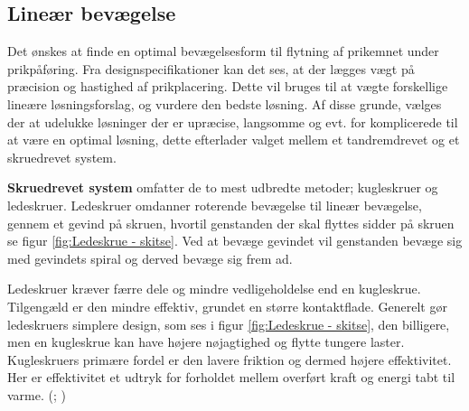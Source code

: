 \subsection{Lineær bevægelse} \label{løsningsanal: Lineær bevægelse}
Det ønskes at finde en optimal bevægelsesform til flytning af prikemnet under prikpåføring. Fra designspecifikationer kan det ses, at der lægges vægt på præcision og hastighed af prikplacering. Dette vil bruges til at vægte forskellige lineære løsningsforslag, og vurdere den bedste løsning.
Af disse grunde, vælges der at udelukke løsninger der er upræcise, langsomme og evt. for komplicerede til at være en optimal løsning, dette efterlader valget mellem et tandremdrevet og et skruedrevet system. \parencite{IndustrialQuickSearch2025LinearPrinciples}

\textbf{Skruedrevet system} omfatter de to mest udbredte metoder; kugleskruer og ledeskruer. Ledeskruer omdanner roterende bevægelse til lineær bevægelse, gennem et gevind på skruen, hvortil genstanden der skal flyttes sidder på skruen se figur \ref{fig:Ledeskrue - skitse}. Ved at bevæge gevindet vil genstanden bevæge sig med gevindets spiral og derved bevæge sig frem ad.

Ledeskruer kræver færre dele og mindre vedligeholdelse end en kugleskrue. Tilgengæld er den mindre effektiv, grundet en større kontaktflade. Generelt gør ledeskruers simplere design, som ses i figur \ref{fig:Ledeskrue - skitse}, den billigere, men en kugleskrue kan have højere nøjagtighed og flytte tungere laster. Kugleskruers primære fordel er den lavere friktion og dermed højere effektivitet. Her er effektivitet et udtryk for forholdet mellem overført kraft og energi tabt til varme. (\cite{UniversalThreadGrindingCompany2020PrecisionAssemblies}; \cite{IndustrialQuickSearch2025LeadBenefits})

